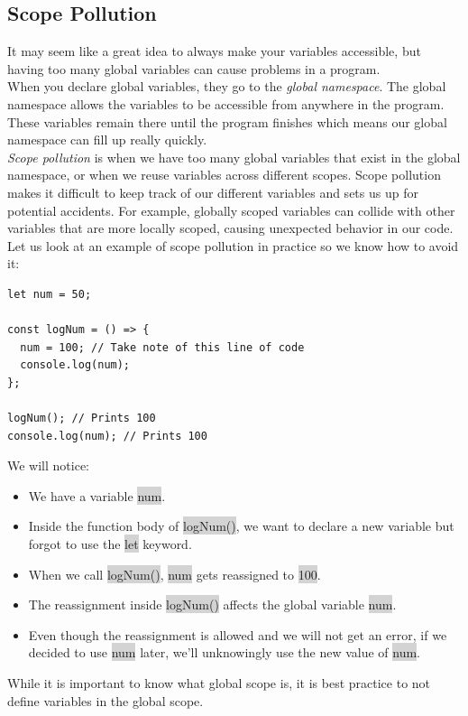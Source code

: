 \documentclass[11pt]{article}
\begin{document}
\subsection{Scope Pollution}
It may seem like a great idea to always make your variables accessible, but having too many global variables can cause problems in a program. \\
\newline
When you declare global variables, they go to the \textit{global namespace}. The global namespace allows the variables to be accessible from anywhere in the program. These variables remain there until the program finishes which means our global namespace can fill up really quickly. \\
\newline
\textit{Scope pollution} is when we have too many global variables that exist in the global namespace, or when we reuse variables across different scopes. Scope pollution makes it difficult to keep track of our different variables and sets us up for potential accidents. For example, globally scoped variables can collide with other variables that are more locally scoped, causing unexpected behavior in our code. \\
\newline
Let us look at an example of scope pollution in practice so we know how to avoid it:
\begin{lstlisting}
let num = 50;

const logNum = () => {
  num = 100; // Take note of this line of code
  console.log(num);
};

logNum(); // Prints 100
console.log(num); // Prints 100
\end{lstlisting}
We will notice:
\begin{itemize}[leftmargin = *]
\item We have a variable \colorbox{lightgray}{num}.
\item Inside the function body of \colorbox{lightgray}{logNum()}, we want to declare a new variable but forgot to use the \colorbox{lightgray}{let} keyword.
\item When we call \colorbox{lightgray}{logNum()}, \colorbox{lightgray}{num} gets reassigned to \colorbox{lightgray}{100}.
\item The reassignment inside \colorbox{lightgray}{logNum()} affects the global variable \colorbox{lightgray}{num}.
\item Even though the reassignment is allowed and we will not get an error, if we decided to use \colorbox{lightgray}{num} later, we’ll unknowingly use the new value of \colorbox{lightgray}{num}.
\end{itemize}
While it is important to know what global scope is, it is best practice to not define variables in the global scope.
\end{document}
